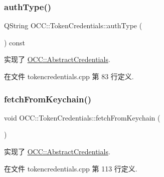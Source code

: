 \subsubsection{\texorpdfstring{auth\+Type()}{authType()}}
{\footnotesize\ttfamily Q\+String O\+C\+C\+::\+Token\+Credentials\+::auth\+Type (\begin{DoxyParamCaption}{ }\end{DoxyParamCaption}) const\hspace{0.3cm}{\ttfamily [virtual]}}



实现了 \hyperlink{class_o_c_c_1_1_abstract_credentials_a47219fcdd7ecc614803d024c361b9c16}{O\+C\+C\+::\+Abstract\+Credentials}.



在文件 tokencredentials.\+cpp 第 83 行定义.

\mbox{\label{class_o_c_c_1_1_token_credentials_a6089c9b79dc88288db02f0fb059c7827}} 
\subsubsection{\texorpdfstring{fetch\+From\+Keychain()}{fetchFromKeychain()}}
{\footnotesize\ttfamily void O\+C\+C\+::\+Token\+Credentials\+::fetch\+From\+Keychain (\begin{DoxyParamCaption}{ }\end{DoxyParamCaption})\hspace{0.3cm}{\ttfamily [virtual]}}



实现了 \hyperlink{class_o_c_c_1_1_abstract_credentials_aac58b02f74811eeedb0fd944bf8a20c3}{O\+C\+C\+::\+Abstract\+Credentials}.



在文件 tokencredentials.\+cpp 第 113 行定义.

\mbox{\label{class_o_c_c_1_1_token_credentials_a5775fc2e216e7e26cf5f1adc764641d7}} 
